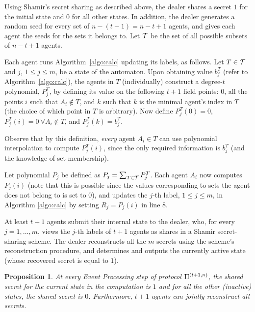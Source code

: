 \documentclass[letterpaper,11pt]{article}
\newcommand{\tnPi}{{\rm {\Pi}}^{(t+1,n)}}
\newtheorem{proposition}[theorem]{Proposition}
\begin{document}
\vspace{.05in}
  Using Shamir's secret sharing as
described above, the dealer shares a secret $1$ for the 
initial state and $0$ for all other states.
In addition, the dealer generates a random seed for every
set of $n - (t-1) = n-t+1$ agents, and gives each agent the seeds for the sets it
belongs to. 
Let ${\cal T}$ be the set of all possible subsets of
$n-t+1$ agents.


\vspace{.06in}
 Each agent runs Algorithm~\ref{algo:calc} updating its labels, as follows.   
Let $T\in {\cal T}$ and $j$, $1 \le j\le m$, be a 
state of the automaton.  Upon obtaining value $b^T_j$ (refer to Algorithm~\ref{algo:calc}),
the agents in $T$ (individually) construct a
degree-$t$ polynomial, $P^T_j$, by defining its value on the following
$t+1$ field points: $0$, all the points $i$ such that $A_i \not \in T$,
and $k$ such that $k$ is the minimal agent's index in $T$ (the choice of 
which point in $T$ is arbitrary). Now define $P^T_j(0)=0$, 
$P^T_j(i)=0 ~ \forall A_i \not \in T$, and $P^T_j(k)=b^T_j$.

Observe that by this definition, {\em every} agent $A_i\in T$ can use
polynomial interpolation to compute $P^T_j(i)$, since the only required
information is $b^T_j$ (and the knowledge of set membership).

Let polynomial $P_j$ be defined as
$P_j=\sum_{T \in {\cal T}} P^T_j$. Each agent $A_i$ now computes 
$P_j(i)$ (note that this is possible since the values corresponding to
sets the agent does not belong to is set to $0$), and updates the 
$j$-th label, $1 \leq j \leq m$, in Algorithm \ref{algo:calc} by 
setting $R_j=P_j(i)$ in line $8$.

\vspace{.06in}
 At least $t+1$ agents submit their 
internal state to the dealer, who, for every $j=1,\ldots,m$, views the
$j$-th labels of $t+1$ agents as shares in a Shamir secret-sharing
scheme. The dealer reconstructs all the $m$ secrets using 
the scheme's reconstruction procedure, and determines and outputs the
currently active state (whose recovered secret is equal to $1$).



\begin{proposition}
\label{prop-threshold}
At every Event Processing step of protocol $\tnPi$, the shared secret
for the current state in the computation is $1$ and for all the other
(inactive) states, the shared secret is $0$. Furthermore, $t+1$ agents
can jointly reconstruct all secrets.
\end{proposition}
\end{document}
